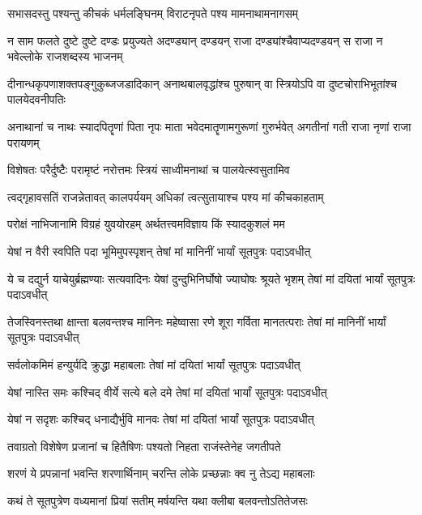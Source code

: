 \twolineshloka
{सभासदस्तु पश्यन्तु कीचकं धर्मलङ्घिनम्}
{विराटनृपते पश्य मामनाथामनागसम्}


\onelineshloka
{न साम फलते दुष्टे दुष्टे दण्डः प्रयुज्यते}
\twolineshloka
{अदण्ड्यान् दण्डयन् राजा दण्ड्यांश्चैवाप्यदण्डयन्}
{स राजा न भवेल्लोके राजशब्दस्य भाजनम्}


\threelineshloka
{दीनान्धकृपणाशक्तपङ्गुकुब्जजडादिकान्}
{अनाथबालवृद्धांश्च पुरुषान् वा स्त्रियोऽपि वा}
{दुष्टचोराभिभूतांश्च पालयेदवनीपतिः}


\threelineshloka
{अनाथानां च नाथः स्यादपितॄणां पिता नृपः}
{माता भवेदमातॄणामगुरूणां गुरुर्भवेत्}
{अगतीनां गती राजा नृणां राजा परायणम्}


\twolineshloka
{विशेषतः परैर्दुष्टैः परामृष्टं नरोत्तमः}
{स्त्रियं साध्वीमनाथां च पालयेत्स्वसुतामिव}


\twolineshloka
{त्वद्गृहावसतिं राजन्नेतावत् कालपर्ययम्}
{अधिकां त्वत्सुतायाश्च पश्य मां कीचकाहताम्}




\twolineshloka
{परोक्षं नाभिजानामि विग्रहं युवयोरहम्}
{अर्थतत्त्वमविज्ञाय किं स्यादकुशलं मम}




\twolineshloka
{येषां न वैरी स्वपिति पदा भूमिमुपस्पृशन्}
{तेषां मां मानिनीं भार्यां सूतपुत्रः पदाऽवधीत्}


\threelineshloka
{ये च दद्युर्न याचेयुर्ब्रह्मण्याः सत्यवादिनः}
{येषां दुन्दुभिनिर्घोषो ज्याघोषः श्रूयते भृशम्}
{तेषां मां दयितां भार्यां सूतपुत्रः पदाऽवधीत्}


\threelineshloka
{तेजस्विनस्तथा क्षान्ता बलवन्तश्च मानिनः}
{महेष्वासा रणे शूरा गर्विता मानतत्पराः}
{तेषां मां मानिनीं भार्यां सूतपुत्रः पदाऽवधीत्}


\twolineshloka
{सर्वलोकमिमं हन्युर्यदि क्रुद्धा महाबलाः}
{तेषां मां दयितां भार्यां सूतपुत्रः पदाऽवधीत्}


\twolineshloka
{येषां नास्ति समः कश्चिद् वीर्ये सत्ये बले दमे}
{तेषां मां दयितां भार्यां सूतपुत्रः पदाऽवधीत्}


\twolineshloka
{येषां न सदृशः कश्चिद् धनाद्यैर्भुवि मानवः}
{तेषां मां दयितां भार्यां सूतपुत्रः पदाऽवधीत्}


\twolineshloka
{तवाग्रतो विशेषेण प्रजानां च हितैषिणः}
{पश्यतो निहता राजंस्तेनेह जगतीपते}


\twolineshloka
{शरणं ये प्रपन्नानां भवन्ति शरणार्थिनाम्}
{चरन्ति लोके प्रच्छन्नाः क्व नु तेऽद्य महाबलाः}


\twolineshloka
{कथं ते सूतपुत्रेण वध्यमानां प्रियां सतीम्}
{मर्षयन्ति यथा क्लीबा बलवन्तोऽतितेजसः}


